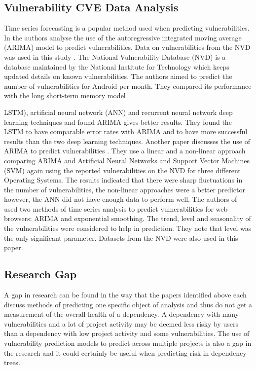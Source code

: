 \documentclass[conference]{IEEEtran}
\begin{document}
\subsection{Vulnerability CVE Data Analysis}
Time series forecasting is a popular method used when predicting vulnerabilities. In \cite{gencer_time_2021} the authors analyse the use of the autoregressive integrated moving average (ARIMA) model to predict vulnerabilities. Data on vulnerabilities from the NVD was used in this study \cite{noauthor_vulnerability_nodate}. The National Vulnerability Database (NVD) is a database maintained by the National Institute for Technology which keeps updated details on known vulnerabilities. The authors aimed to predict the number of vulnerabilities for Android per month. They compared its performance with the long short-term memory model {LSTM), artificial neural network (ANN) and recurrent neural network deep learning techniques and found ARIMA gives better results. They found the LSTM to have comparable error rates with ARIMA and to have more successful results than the two deep learning techniques. Another paper discusses the use of ARIMA to predict vulnerabilities \cite{pokhrel_cybersecurity_2017}. They use a linear and a non-linear approach comparing ARIMA and Artificial Neural Networks and Support Vector Machines (SVM) again using the reported vulnerabilities on the NVD for three different Operating Systems. The results indicated that there were sharp fluctuations in the number of vulnerabilities, the non-linear approaches were a better predictor however, the ANN did not have enough data to perform well. The authors of \cite{roumani_time_2015} used two methods of time series analysis to predict vulnerabilities for web browsers: ARIMA and exponential smoothing. The trend, level and seasonality of the vulnerabilities were considered to help in prediction. They note that level was the only significant parameter. Datasets from the NVD were also used in this paper.

\subsection{Research Gap}
A gap in research can be found in the way that the papers identified above each discuss methods of predicting one specific object of analysis and thus do not get a measurement of the overall health of a dependency. A dependency with many vulnerabilities and a lot of project activity may be deemed less risky by users than a dependency with low project activity and some vulnerabilities. The use of vulnerability prediction models to predict across multiple projects is also a gap in the research and it could certainly be useful when predicting risk in dependency trees. 

}
\end{document}
